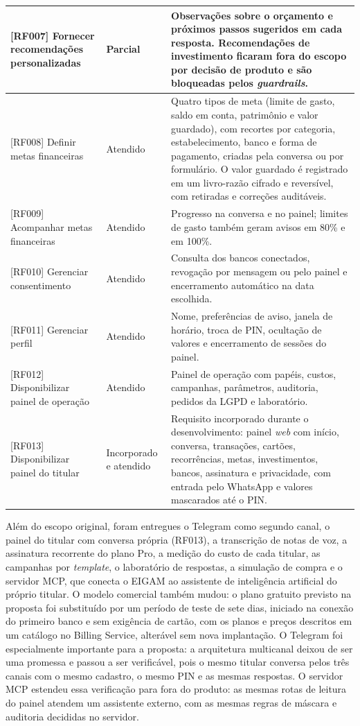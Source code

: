 {\begin{longtable}{|L{3.4cm}|L{2.4cm}|L{8.7cm}|}
{[RF007]} Fornecer recomendações personalizadas & Parcial & Observações sobre o orçamento e próximos passos sugeridos em cada resposta. Recomendações de investimento ficaram fora do escopo por decisão de produto e são bloqueadas pelos \textit{guardrails}. \\ \hline
{[RF008]} Definir metas financeiras & Atendido & Quatro tipos de meta (limite de gasto, saldo em conta, patrimônio e valor guardado), com recortes por categoria, estabelecimento, banco e forma de pagamento, criadas pela conversa ou por formulário. O valor guardado é registrado em um livro-razão cifrado e reversível, com retiradas e correções auditáveis. \\ \hline
{[RF009]} Acompanhar metas financeiras & Atendido & Progresso na conversa e no painel; limites de gasto também geram avisos em 80\% e em 100\%. \\ \hline
{[RF010]} Gerenciar consentimento & Atendido & Consulta dos bancos conectados, revogação por mensagem ou pelo painel e encerramento automático na data escolhida. \\ \hline
{[RF011]} Gerenciar perfil & Atendido & Nome, preferências de aviso, janela de horário, troca de PIN, ocultação de valores e encerramento de sessões do painel. \\ \hline
{[RF012]} Disponibilizar painel de operação & Atendido & Painel de operação com papéis, custos, campanhas, parâmetros, auditoria, pedidos da LGPD e laboratório. \\ \hline
{[RF013]} Disponibilizar painel do titular & Incorporado e atendido & Requisito incorporado durante o desenvolvimento: painel \textit{web} com início, conversa, transações, cartões, recorrências, metas, investimentos, bancos, assinatura e privacidade, com entrada pelo WhatsApp e valores mascarados até o PIN. \\ \hline
\end{longtable}
}

Além do escopo original, foram entregues o Telegram como segundo canal, o painel do titular com conversa própria (RF013), a transcrição de notas de voz, a assinatura recorrente do plano Pro, a medição do custo de cada titular, as campanhas por \textit{template}, o laboratório de respostas, a simulação de compra e o servidor MCP, que conecta o EIGAM ao assistente de inteligência artificial do próprio titular. O modelo comercial também mudou: o plano gratuito previsto na proposta foi substituído por um período de teste de sete dias, iniciado na conexão do primeiro banco e sem exigência de cartão, com os planos e preços descritos em um catálogo no Billing Service, alterável sem nova implantação. O Telegram foi especialmente importante para a proposta: a arquitetura multicanal deixou de ser uma promessa e passou a ser verificável, pois o mesmo titular conversa pelos três canais com o mesmo cadastro, o mesmo PIN e as mesmas respostas. O servidor MCP estendeu essa verificação para fora do produto: as mesmas rotas de leitura do painel atendem um assistente externo, com as mesmas regras de máscara e auditoria decididas no servidor.

